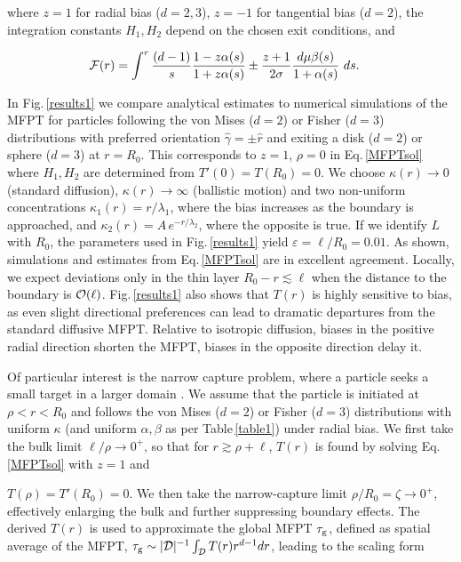 \documentclass[
 reprint,










 amsmath,amssymb,
 aps, prl,






longbibliography
]{revtex4-2}
\begin{document}
where $z = 1$ for radial bias ($d =2,3$),
$z = -1$ for tangential bias ($d=2$),
the integration constants
$H_1, H_2$ depend on the chosen exit conditions,
and

\begin{eqnarray}

\label{MFPTIF}
{\cal F}(r) = \int^ r  \frac {(d-1)} {s} \frac {1 - z \alpha(s)}{1 +  z \alpha(s)} \pm  \frac{z+1}{2 \sigma}
\frac {d \mu \beta(s) }{1 + \alpha(s)} \ ds. \quad
\end{eqnarray}

In Fig.\,\ref{results1} we compare analytical estimates to numerical simulations of the MFPT for particles following the von Mises
($d=2$)
or Fisher ($d=3$) distributions with preferred orientation
$\hat \gamma = \pm \hat r$ and exiting a disk
($d=2$) or sphere ($d=3$) at $r = R_0$.
This corresponds to $z=1$, $\rho=0$
in Eq.\,\ref{MFPTsol}
where $H_1, H_2$ are determined from $T'(0)=T(R_0)=0$.
We choose $\kappa(r) \to 0$ (standard diffusion),
$\kappa(r) \to \infty$ (ballistic motion) and
two non-uniform concentrations
$\kappa_1(r) = r/\lambda_1$, where the bias increases
as the boundary
is approached, and $\kappa_2(r) = A \, e^{-r/\lambda_2}$, where the opposite is true.
If we identify $L$ with $R_0$, the parameters used in Fig.\,\ref{results1} yield $\varepsilon = \ell/R_0 =0.01$. As shown, simulations and estimates from Eq.\,\ref{MFPTsol} are in excellent agreement.
Locally, we expect deviations only in the thin layer $R_0 - r \lesssim \ell$
when the distance to the boundary is ${\cal O}(\ell)$.
Fig.\,\ref{results1} also shows that $T(r)$ is highly sensitive to bias, as even slight directional preferences can lead to dramatic departures from the standard diffusive MFPT.
Relative to isotropic diffusion, biases in the positive radial direction shorten the MFPT, biases in the opposite direction
delay it.

Of particular interest is the narrow capture problem, where
a particle seeks a small target in a larger domain
\cite{Kurella2015,CKL2025}. We assume that
the particle is initiated at $\rho < r < R_0$ and
follows the von Mises ($d=2$) or Fisher ($d=3$) distributions with uniform
$\kappa$ (and uniform $\alpha, \beta$ as per Table\,\ref{table1}) under radial bias. We first take the bulk limit $\ell/\rho \to 0^+$, so that for
$r \gtrsim \rho + \ell$, $T(r)$ is found by solving Eq.\,\ref{MFPTsol} with $z=1$ and

$T(\rho) =T'(R_0) =0$. We then take the narrow-capture
limit $\rho/R_0 = \zeta \to 0^+$, effectively enlarging the bulk and further suppressing boundary effects.
The derived $T(r)$ is used to approximate the global MFPT  $\tau_{\rm g}$,
defined as spatial average of the MFPT,
$\tau_{\rm g} \sim |{\cal{D}}|^{-1}\int_{\cal{D}}T(r) r^{d-1} dr$, leading to the
scaling form
\end{document}
